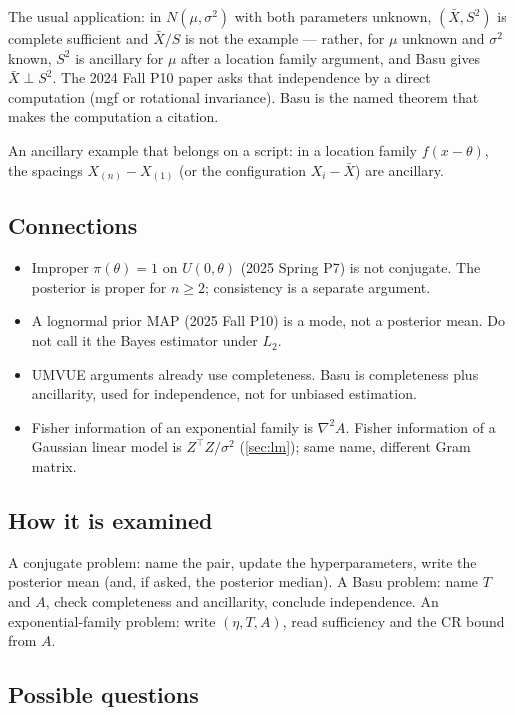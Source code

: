 The usual application: in \(N(\mu,\sigma^{2})\) with both parameters unknown, \((\bar X,S^{2})\) is complete sufficient and \(\bar X/S\) is not the example --- rather, for \(\mu\) unknown and \(\sigma^{2}\) known, \(S^{2}\) is ancillary for \(\mu\) after a location family argument, and Basu gives \(\bar X\perp S^{2}\). The 2024 Fall P10 paper asks that independence by a direct computation (mgf or rotational invariance). Basu is the named theorem that makes the computation a citation.

An ancillary example that belongs on a script: in a location family \(f(x-\theta)\), the spacings \(X_{(n)}-X_{(1)}\) (or the configuration \(X_{i}-\bar X\)) are ancillary.

\subsection{Connections}

\begin{itemize}
    \item Improper \(\pi(\theta)=1\) on \(U(0,\theta)\) (2025 Spring P7) is not conjugate. The posterior is proper for \(n\ge 2\); consistency is a separate argument.
    \item A lognormal prior MAP (2025 Fall P10) is a mode, not a posterior mean. Do not call it the Bayes estimator under \(L_{2}\).
    \item UMVUE arguments already use completeness. Basu is completeness plus ancillarity, used for independence, not for unbiased estimation.
    \item Fisher information of an exponential family is \(\nabla^{2}A\). Fisher information of a Gaussian linear model is \(Z^{\top}Z/\sigma^{2}\) (\cref{sec:lm}); same name, different Gram matrix.
\end{itemize}

\subsection{How it is examined}

A conjugate problem: name the pair, update the hyperparameters, write the posterior mean (and, if asked, the posterior median). A Basu problem: name \(T\) and \(A\), check completeness and ancillarity, conclude independence. An exponential-family problem: write \((\eta,T,A)\), read sufficiency and the CR bound from \(A\).

\subsection{Possible questions}

